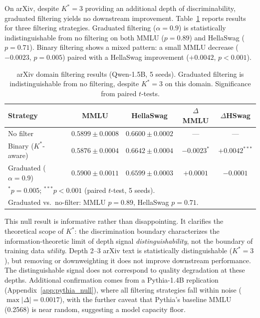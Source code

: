 \documentclass[11pt,a4paper]{article}
\begin{document}
On arXiv, despite $K^*\!=\!3$ providing an additional depth of discriminability, graduated filtering yields no downstream improvement. Table~\ref{tab:arxiv_null} reports results for three filtering strategies. Graduated filtering ($\alpha\!=\!0.9$) is statistically indistinguishable from no filtering on both MMLU ($p = 0.89$) and HellaSwag ($p = 0.71$). Binary filtering shows a mixed pattern: a small MMLU decrease ($-0.0023$, $p = 0.005$) paired with a HellaSwag improvement ($+0.0042$, $p < 0.001$).

\begin{table}[t]
\centering
\small
\caption{arXiv domain filtering results (Qwen-1.5B, 5 seeds). Graduated filtering is indistinguishable from no filtering, despite $K^*\!=\!3$ on this domain. Significance from paired $t$-tests.}
\label{tab:arxiv_null}
\begin{tabular}{lcccc}
\toprule
\textbf{Strategy} & \textbf{MMLU} & \textbf{HellaSwag} & $\Delta$\textbf{MMLU} & $\Delta$\textbf{HSwag} \\
\midrule
No filter           & $0.5899 \pm 0.0008$ & $0.6600 \pm 0.0002$ & ---   & --- \\
Binary ($K^*$-aware) & $0.5876 \pm 0.0004$ & $0.6642 \pm 0.0004$ & $-0.0023^{*}$ & $+0.0042^{***}$ \\
Graduated ($\alpha\!=\!0.9$) & $0.5900 \pm 0.0011$ & $0.6599 \pm 0.0003$ & $+0.0001$ & $-0.0001$ \\
\bottomrule
\multicolumn{5}{l}{\footnotesize $^{*}p=0.005$; $^{***}p<0.001$ (paired $t$-test, 5 seeds).} \\
\multicolumn{5}{l}{\footnotesize Graduated vs.\ no-filter: MMLU $p=0.89$, HellaSwag $p=0.71$.}
\end{tabular}
\end{table}

This null result is informative rather than disappointing. It clarifies the theoretical scope of $K^*$: the discrimination boundary characterizes the information-theoretic limit of depth signal \emph{distinguishability}, not the boundary of training data \emph{utility}. Depth 2--3 arXiv text is statistically distinguishable ($K^*\!=\!3$), but removing or downweighting it does not improve downstream performance. The distinguishable signal does not correspond to quality degradation at these depths. Additional confirmation comes from a Pythia-1.4B replication (Appendix~\ref{app:pythia_null}), where all filtering strategies fall within noise ($\max |\Delta| = 0.0017$), with the further caveat that Pythia's baseline MMLU (0.2568) is near random, suggesting a model capacity floor.
\end{document}

